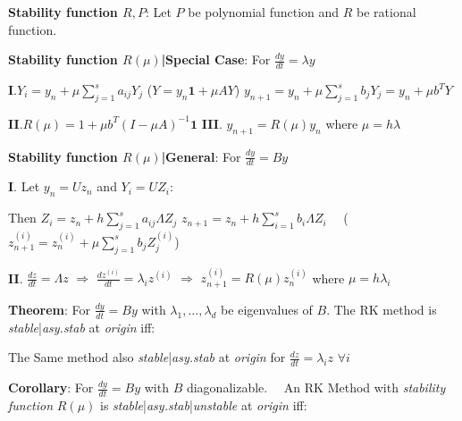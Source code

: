 \documentclass[9pt]{article}
\begin{document}
\textbf{Stability function $R,P$}: Let $P$ be polynomial function and $R$ be rational function.


\textbf{Stability function $R(\mu)$|Special Case}: For $\frac{dy}{dt}=\lambda y$  

\quad \textbf{I}.$Y_i=y_n+\mu\sum^s_{j=1}a_{ij}Y_j$ \quad ($Y=y_n\mathbf{1}+\mu AY$) \qquad $y_{n+1}=y_n+\mu\sum^s_{j=1}b_jY_j=y_n+\mu b^TY$

\quad \textbf{II}.$R(\mu)=1+\mu b^T(I-\mu A)^{-1}\mathbf{1}$ \hspace{80pt} \textbf{III}. $y_{n+1}=R(\mu)y_n$ \qquad where $\mu=h\lambda$

\textbf{Stability function $R(\mu)$|General}: For $\frac{dy}{dt}=By$  

\quad \textbf{I}. Let $y_n=U z_n$ and $Y_i=UZ_i$:

\qquad Then $Z_{i}=z_n+h\sum_{j=1}^{s}a_{ij}\Lambda Z_j$  \qquad $z_{n+1}=z_n+h\sum_{i=1}^{s}b_i\Lambda Z_i$ \ \ {\footnotesize ($z_{n+1}^{(i)}=z_{n}^{(i)}+\mu\sum^s_{j=1}b_jZ_j^{(i)}$)}

\quad \textbf{II}. $\frac{dz}{dt}=\Lambda z$ \quad $\Rightarrow$ \quad $\frac{dz^{(i)}}{dt}=\lambda_i z^{(i)}$ \quad $\Rightarrow$ \quad $z_{n+1}^{(i)} = R(\mu)z_n^{(i)}$ \quad where $\mu=h\lambda_i$ 

\textbf{Theorem}: For $\frac{dy}{dt}=By$ with $\lambda_1,...,\lambda_d$ be eigenvalues of $B$. The RK method is \textit{stable}|\textit{asy.stab} at \textit{origin} iff:

\quad The Same method also \textit{stable}|\textit{asy.stab} at \textit{origin} for $\frac{dz}{dt}=\lambda_iz$ $\forall i$

\textbf{Corollary}: {\small For $\frac{dy}{dt}=By$ with $B$ diagonalizable. \ \ An RK Method with \textit{stability function} $R(\mu)$ is \textit{stable}|\textit{asy.stab}|\textit{unstable} at \textit{origin} iff: }
\end{document}
